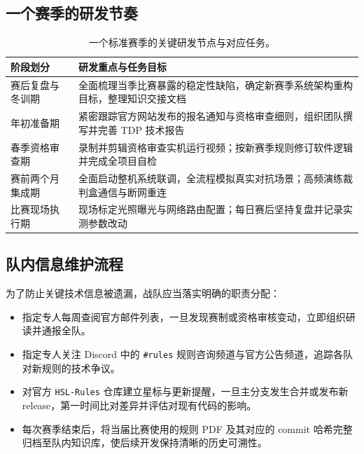 \subsection{一个赛季的研发节奏}

\begin{table}[H]
\centering
\small
\begin{tabularx}{\textwidth}{p{3.2cm} X}
\toprule
\textbf{阶段划分} & \textbf{研发重点与任务目标} \\
\midrule
赛后复盘与冬训期 & 全面梳理当季比赛暴露的稳定性缺陷，确定新赛季系统架构重构目标，整理知识交接文档 \\
\addlinespace
年初准备期 & 紧密跟踪官方网站发布的报名通知与资格审查细则，组织团队撰写并完善 TDP 技术报告 \\
\addlinespace
春季资格审查期 & 录制并剪辑资格审查实机运行视频；按新赛季规则修订软件逻辑并完成全项目自检 \\
\addlinespace
赛前两个月集成期 & 全面启动整机系统联调，全流程模拟真实对抗场景；高频演练裁判盒通信与断网重连 \\
\addlinespace
比赛现场执行期 & 现场标定光照曝光与网络路由配置；每日赛后坚持复盘并记录实测参数改动 \\
\bottomrule
\end{tabularx}
\caption{一个标准赛季的关键研发节点与对应任务。\advice}
\end{table}

\subsection{队内信息维护流程}

为了防止关键技术信息被遗漏，战队应当落实明确的职责分配：
\begin{itemize}[leftmargin=*]
    \item 指定专人每周查阅官方邮件列表，一旦发现赛制或资格审核变动，立即组织研读并通报全队。
    \item 指定专人关注 Discord 中的 \texttt{\#rules} 规则咨询频道与官方公告频道，追踪各队对新规则的技术争议。
    \item 对官方 \texttt{HSL-Rules} 仓库建立星标与更新提醒，一旦主分支发生合并或发布新 release，第一时间比对差异并评估对现有代码的影响。
    \item 每次赛季结束后，将当届比赛使用的规则 PDF 及其对应的 commit 哈希完整归档至队内知识库，使后续开发保持清晰的历史可溯性。
\end{itemize}

\newpage